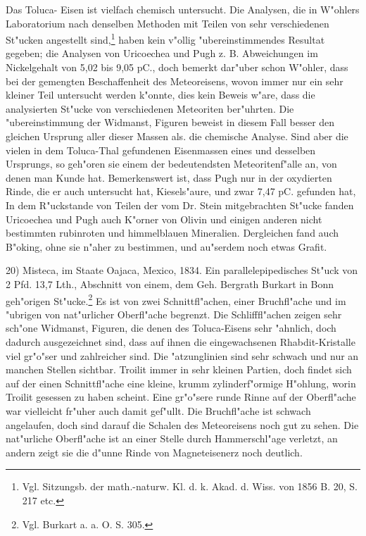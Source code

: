 \documentclass[a4paper, 11pt, oneside, german]{article}
\begin{document}
Das Toluca- Eisen ist vielfach chemisch untersucht. Die Analysen, die in W"ohlers Laboratorium nach denselben Methoden mit Teilen von sehr verschiedenen St"ucken angestellt sind,\footnote{Vgl. Sitzungsb. der math.-naturw. Kl. d. k. Akad. d. Wiss. von 1856 B. 20, S. 217 etc.} haben kein v"ollig "ubereinstimmendes Resultat gegeben; die Analysen von Uricoechea und Pugh z. B. Abweichungen im Nickelgehalt von 5,02 bis 9,05 pC., doch bemerkt dar"uber schon W"ohler, dass bei der gemengten Beschaffenheit des Meteoreisens, wovon immer nur ein sehr kleiner Teil untersucht werden k"onnte, dies kein Beweis w"are, dass die analysierten St"ucke von verschiedenen Meteoriten ber"uhrten. Die "ubereinstimmung der Widmanst, Figuren beweist in diesem Fall besser den gleichen Ursprung aller dieser Massen als. die chemische Analyse. Sind aber die vielen in dem Toluca-Thal gefundenen Eisenmassen eines und desselben Ursprungs, so geh"oren sie einem der bedeutendsten Meteoritenf"alle an, von denen man Kunde hat. Bemerkenswert ist, dass Pugh nur in der oxydierten Rinde, die er auch untersucht hat, Kiesels"aure, und zwar 7,47 pC. gefunden hat, In dem R"uckstande von Teilen der vom Dr. Stein mitgebrachten St"ucke fanden Uricoechea und Pugh auch K"orner von Olivin und einigen anderen nicht bestimmten rubinroten und himmelblauen Mineralien. Dergleichen fand auch B"oking, ohne sie n"aher zu bestimmen, und au"serdem noch etwas Grafit.

20) Misteca, im Staate Oajaca, Mexico, 1834. Ein parallelepipedisches St"uck von 2 Pfd. 13,7 Lth., Abschnitt von einem, dem Geh. Bergrath Burkart in Bonn geh"origen St"ucke.\footnote{Vgl. Burkart a. a. O. S. 305.} Es ist von zwei Schnittfl"achen, einer Bruchfl"ache und im "ubrigen von nat"urlicher Oberfl"ache begrenzt. Die Schlifffl"achen zeigen sehr sch"one Widmanst, Figuren, die denen des Toluca-Eisens sehr "ahnlich, doch dadurch ausgezeichnet sind, dass auf ihnen die eingewachsenen Rhabdit-Kristalle viel gr"o"ser und zahlreicher sind. Die "atzunglinien sind sehr schwach und nur an manchen Stellen sichtbar. Troilit immer in sehr kleinen Partien, doch findet sich auf der einen Schnittfl"ache eine kleine, krumm zylinderf"ormige H"ohlung, worin Troilit gesessen zu haben scheint. Eine gr"o"sere runde Rinne auf der Oberfl"ache war vielleicht fr"uher auch damit gef"ullt. Die Bruchfl"ache ist schwach angelaufen, doch sind darauf die Schalen des Meteoreisens noch gut zu sehen. Die nat"urliche Oberfl"ache ist an einer Stelle durch Hammerschl"age verletzt, an andern zeigt sie die d"unne Rinde von Magneteisenerz noch deutlich.
\end{document}
